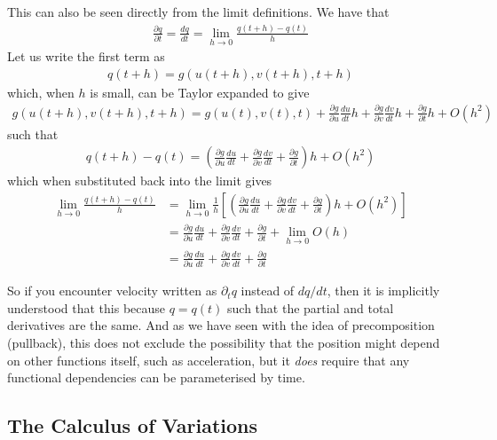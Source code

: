 \documentclass[a4paper]{article}
\begin{document}
    This can also be seen directly from the limit definitions. We have that 
    \begin{align*}
        \frac{\partial q}{\partial t} = \frac{dq}{dt} = \lim_{h \to 0} \frac{q(t + h) - q(t)}{h} 
    \end{align*}
    Let us write the first term as \begin{align*}
        q(t + h) = g(u(t + h), v(t + h), t + h)
    \end{align*}
    which, when \(h\) is small, can be Taylor expanded to give \begin{align*}
        g(u(t + h), v(t + h), t + h) = g(u(t), v(t), t) + \frac{\partial g}{\partial u} \frac{du}{dt}h + \frac{\partial g}{\partial v}\frac{dv}{dt}h + \frac{\partial g}{\partial t}h + O(h^{2})
    \end{align*}
    such that \begin{align*}
        q(t + h) - q(t) = \left(\frac{\partial g}{\partial u} \frac{du}{dt} + \frac{\partial g}{\partial v}\frac{dv}{dt} + \frac{\partial g}{\partial t}\right)h + O(h^{2})
    \end{align*}
    which when substituted back into the limit gives \begin{align*}
        \lim_{h \to 0} \frac{q(t + h) - q(t)}{h} &=
        \lim_{h \to 0} \frac{1}{h}\left[\left(\frac{\partial g}{\partial u} \frac{du}{dt} + \frac{\partial g}{\partial v}\frac{dv}{dt} + \frac{\partial g}{\partial t}\right)h + O(h^{2})\right]\\
        &= \frac{\partial g}{\partial u} \frac{du}{dt} + \frac{\partial g}{\partial v}\frac{dv}{dt} + \frac{\partial g}{\partial t} + \lim_{h \to 0} O(h)\\
        &= \frac{\partial g}{\partial u} \frac{du}{dt} + \frac{\partial g}{\partial v}\frac{dv}{dt} + \frac{\partial g}{\partial t}
    \end{align*}

    So if you encounter velocity written as \(\partial_t q\) instead of \(dq / dt\), then it is implicitly understood that this because \(q = q(t)\) such that the partial and total derivatives are the same. And as we have seen with the idea of precomposition (pullback), this does not exclude the possibility that the position might depend on other functions itself, such as acceleration, but it \textit{does} require that any functional dependencies can be parameterised by time.

    \subsection{The Calculus of Variations}
\end{document}
